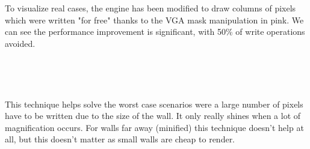 To visualize real cases, the engine has been modified to draw columns of pixels which were written "for free" thanks to the VGA mask manipulation in pink. We can see the performance improvement is significant, with 50\% of write operations avoided.

\begin{minipage}{\textwidth}
 \centering
\vspace*{0.5cm}\\

\end{minipage}



\par

\begin{minipage}{\textwidth}
 \centering
 \vspace*{0.5cm}\\
\end{minipage}
This technique helps solve the worst case scenarios were a large number of pixels have to be written due to the size of the wall. It only really shines when a lot of magnification occurs. For walls far away (minified) this technique doesn't help at all, but this doesn't matter as small walls are cheap to render.\\






















